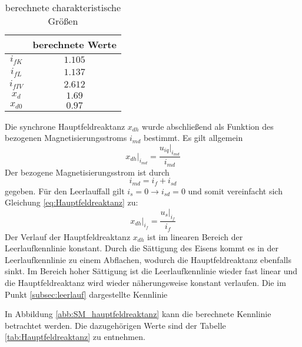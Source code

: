 \begin{table}[!ht]
\centering
\begin{tabular}{|c|c|}
\hline
            & berechnete Werte  \\ \hline
$i_{fK}$    &  $1.105$          \\ \hline
$i_{fL}$    & $1.137$           \\ \hline
$i_{fIV}$   & $2.612$           \\ \hline
$x_d$       & $1.69$            \\ \hline
$x_{d0}$   & $0.97$            \\ \hline
\end{tabular}
\caption{berechnete charakteristische Größen}
\label{tab:Fischer_Hinnen_berechnete_Werte}
\end{table}
Die synchrone Hauptfeldreaktanz $x_{dh}$ wurde abschließend als Funktion des bezogenen Magnetisierungsstroms $i_{md}$ bestimmt. Es gilt allgemein
\begin{equation*}
    \label{eq:Hauptfeldreaktanz}
    x_{dh} \big|_{i_{md}} = \frac{u_{iq} \big|_{i_{md}}}{i_{md}}
\end{equation*}
Der bezogene Magnetisierungsstrom ist durch 
\begin{equation*}
    i_{md} = i_f + i_{sd}
\end{equation*}
gegeben. Für den Leerlauffall gilt $i_s = 0 \rightarrow i_{sd} = 0$ und somit vereinfacht sich Gleichung \ref{eq:Hauptfeldreaktanz} zu:
\begin{equation*}
        x_{dh} \big|_{i_{f}} = \frac{u_{s} \big|_{i_{f}}}{i_{f}}
\end{equation*}
Der Verlauf der Hauptfeldreaktanz $x_{dh}$ ist im linearen Bereich der Leerlaufkennlinie konstant. Durch die Sättigung des Eisens kommt es in der Leerlaufkennlinie zu einem Abflachen, wodurch die Hauptfeldreaktanz ebenfalls sinkt. Im Bereich hoher Sättigung ist die Leerlaufkennlinie wieder fast linear und die Hauptfeldreaktanz wird wieder näherungsweise konstant verlaufen. Die im Punkt \ref{subsec:leerlauf} dargestellte Kennlinie 


In Abbildung \ref{abb:SM_hauptfeldreaktanz} kann die berechnete Kennlinie betrachtet werden. Die dazugehörigen Werte sind der Tabelle \ref{tab:Hauptfeldreaktanz} zu entnehmen.



